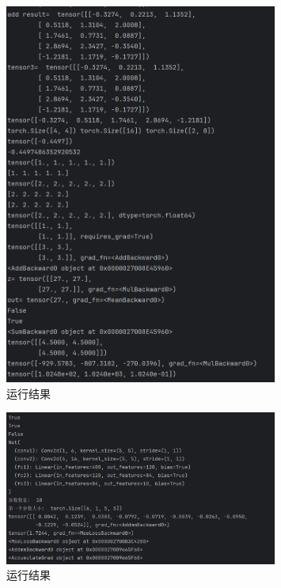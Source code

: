 \documentclass{article}
\begin{document}
\begin{figure}[htbp]
\centering
\includegraphics[width=0.8\textwidth]{7.png}
\caption{运行结果}
\end{figure}

\begin{figure}[htbp]
\centering
\includegraphics[width=0.8\textwidth]{8.png}
\caption{运行结果}
\end{figure}
\newpage
\end{document}

